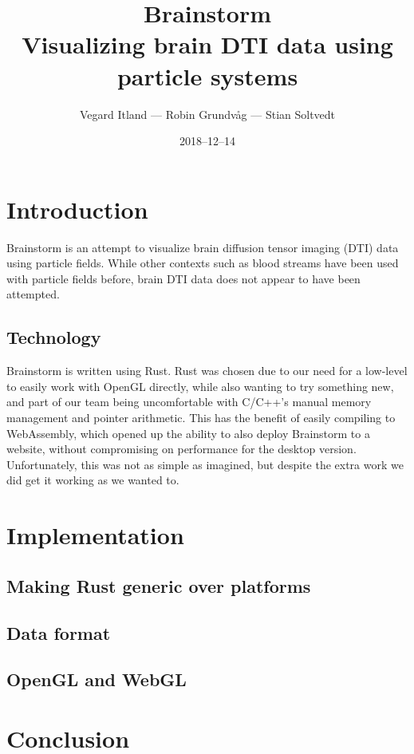 \documentclass{article}
\title{%
Brainstorm\\
\large Visualizing brain DTI data using particle systems}
\author{Vegard Itland --- Robin Grundvåg --- Stian Soltvedt}
\date{2018--12--14}
\begin{document}
\maketitle
{}

\section*{Introduction}

Brainstorm is an attempt to visualize brain diffusion tensor imaging (DTI) data using particle fields. While other contexts such as blood streams have been used with particle fields before, brain DTI data does not appear to have been attempted.

\subsection*{Technology}

Brainstorm is written using Rust. Rust was chosen due to our need for a low-level to easily work with OpenGL directly, while also wanting to try something new, and part of our team being uncomfortable with C/C++'s manual memory management and pointer arithmetic. This has the benefit of easily compiling to WebAssembly, which opened up the ability to also deploy Brainstorm to a website, without compromising on performance for the desktop version. Unfortunately, this was not as simple as imagined, but despite the extra work we did get it working as we wanted to.

\section*{Implementation}

\subsection*{Making Rust generic over platforms}


\subsection*{Data format}


\subsection*{OpenGL and WebGL}


\section*{Conclusion}

\end{document}

